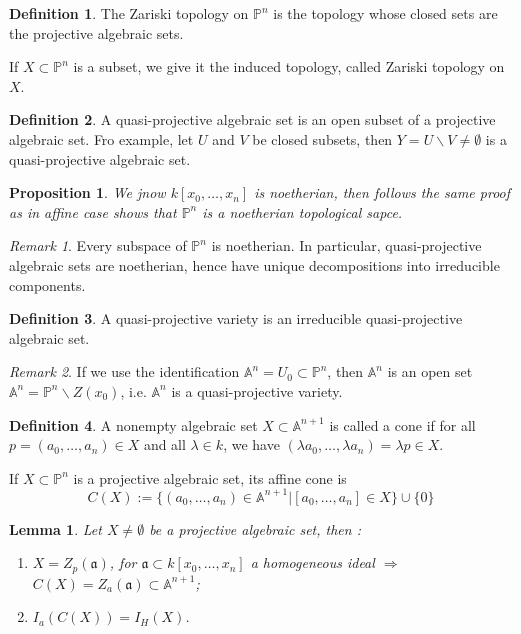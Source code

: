 \documentclass{amsart}
\theoremstyle{plain}
\newtheorem{lemma}{Lemma}
\newtheorem{proposition}{Proposition}
\theoremstyle{definition}
\newtheorem{definition}{Definition}
\theoremstyle{remark}
\newtheorem*{remark}{Remark}
\numberwithin{equation}{section}
\begin{document}
\begin{definition}
	The Zariski topology on $ \mathbb{P}^n $ is the topology whose closed sets are the projective algebraic sets.
	
	If $ X\subset \mathbb{P}^n $ is a subset, we give it the induced topology, called Zariski topology on $ X $.
\end{definition}
\begin{definition}
	A quasi-projective algebraic set is an open subset of a projective algebraic set. Fro example, let $ U $ and $ V $ be closed subsets, then $ Y=U\backslash V\neq \emptyset $ is a quasi-projective algebraic set.  
\end{definition}
\begin{proposition}
	We jnow $ k[x_0,\dots,x_n] $ is noetherian, then follows the same proof as in affine case shows that $ \mathbb{P}^n $ is a noetherian topological sapce.
\end{proposition}
\begin{remark}
	Every subspace of $ \mathbb{P}^n $ is noetherian. In particular, quasi-projective algebraic sets are noetherian, hence have unique decompositions into irreducible components.
\end{remark}
\begin{definition}
	A quasi-projective variety is an irreducible quasi-projective algebraic set.
\end{definition}
\begin{remark}
	If we use the identification $ \mathbb{A}^n=U_0\subset \mathbb{P}^n $, then $ \mathbb{A}^n $ is an open set $ \mathbb{A}^n=\mathbb{P}^n\backslash Z(x_0) $, i.e. $ \mathbb{A}^n $ is a quasi-projective variety.  
\end{remark}
\begin{definition}
	A nonempty algebraic set $ X\subset \mathbb{A}^{n+1} $ is called a cone if for all $ p=(a_0,\dots,a_n)\in X $ and all $ \lambda \in k $, we have $ (\lambda a_0,\dots,\lambda a_n)=\lambda p\in X $.
	
	If $ X\subset \mathbb{P}^n $ is a projective algebraic set, its affine cone is 
	\begin{equation}
	C(X):=\{ (a_0,\dots,a_n)\in \mathbb{A}^{n+1}|[a_0,\dots,a_n]\in X \}\cup\{ 0 \}
	\end{equation}
\end{definition}
\begin{lemma}
	Let $ X\neq\emptyset $ be a projective algebraic set, then :
	\begin{enumerate}
		\item $ X=Z_p(\mathfrak{a}) $, for $ \mathfrak{a}\subset k[x_0,\dots,x_n]$ a   homogeneous ideal $ \Rightarrow $ $ C(X)=Z_a(\mathfrak{a})\subset \mathbb{A}^{n+1} $;
		\item $ I_a(C(X))=I_H(X) $.
	\end{enumerate}
\end{lemma}
\end{document}
